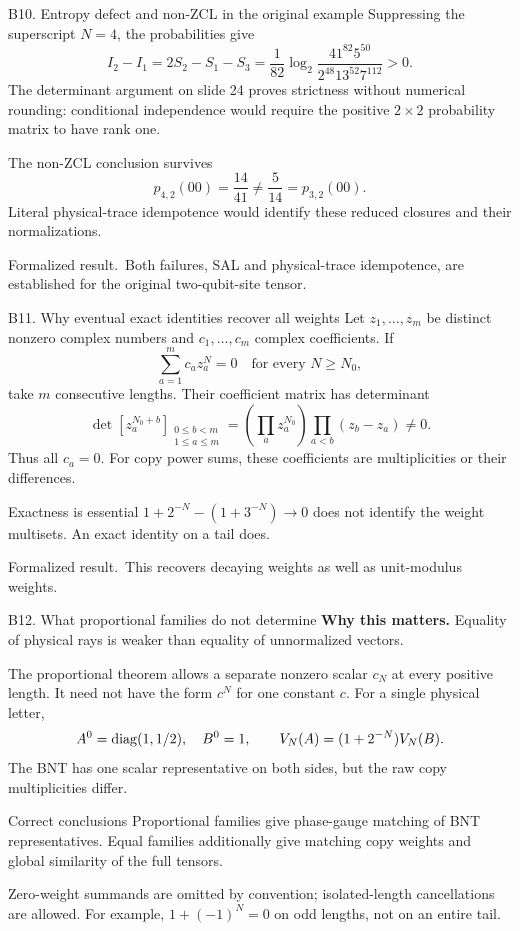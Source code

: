 \documentclass[aspectratio=169,14pt]{beamer}
\newcommand{\why}[1]{\textcolor{amber}{\textbf{Why this matters.}} #1\par\medskip}
\newcommand{\verified}{\textcolor{mintgreen}{Formalized result.}}
\begin{document}
\begin{frame}{B10. Entropy defect and non-ZCL in the original example}
Suppressing the superscript $N=4$, the probabilities give
\[
 I_2-I_1=2S_2-S_1-S_3
 =\frac1{82}\log_2\frac{41^{82}5^{50}}{2^{48}13^{52}7^{112}}>0.
\]
The determinant argument on slide 24 proves strictness without numerical rounding: conditional independence would require the positive $2\times2$ probability matrix to have rank one.
\begin{block}{The non-ZCL conclusion survives}
\[
 p_{4,2}(00)=\frac{14}{41}\ne\frac5{14}=p_{3,2}(00).
\]
Literal physical-trace idempotence would identify these reduced closures and their normalizations.
\end{block}
\verified\ Both failures, SAL and physical-trace idempotence, are established for the original two-qubit-site tensor.
\end{frame}
\begin{frame}{B11. Why eventual exact identities recover all weights}
Let $z_1,\ldots,z_m$ be distinct nonzero complex numbers and $c_1,\ldots,c_m$ complex coefficients. If
\[
 \sum_{a=1}^m c_az_a^N=0\quad\text{for every }N\geq N_0,
\]
take $m$ consecutive lengths. Their coefficient matrix has determinant
\[
 \det[z_a^{N_0+b}]_{\substack{0\leq b<m\\1\leq a\leq m}}
 =\left(\prod_a z_a^{N_0}\right)\prod_{a<b}(z_b-z_a)\ne0.
\]
Thus all $c_a=0$. For copy power sums, these coefficients are multiplicities or their differences.
\begin{block}{Exactness is essential}
$1+2^{-N}-(1+3^{-N})\to0$ does not identify the weight multisets.
An exact identity on a tail does.
\end{block}
\verified\ This recovers decaying weights as well as unit-modulus weights.
\end{frame}
\begin{frame}{B12. What proportional families do not determine}
\why{Equality of physical rays is weaker than equality of unnormalized vectors.}
The proportional theorem allows a separate nonzero scalar $c_N$ at every positive length. It need not have the form $c^N$ for one constant $c$.
For a single physical letter,
\[
 A^0=\mathrm{diag}(1,1/2),\quad B^0=1,\qquad V_N(A)=(1+2^{-N})V_N(B).
\]
The BNT has one scalar representative on both sides, but the raw copy multiplicities differ.
\begin{block}{Correct conclusions}
Proportional families give phase-gauge matching of BNT representatives. Equal families additionally give matching copy weights and global similarity of the full tensors.
\end{block}
Zero-weight summands are omitted by convention; isolated-length cancellations are allowed. For example, $1+(-1)^N=0$ on odd lengths, not on an entire tail.
\end{frame}
\end{document}

